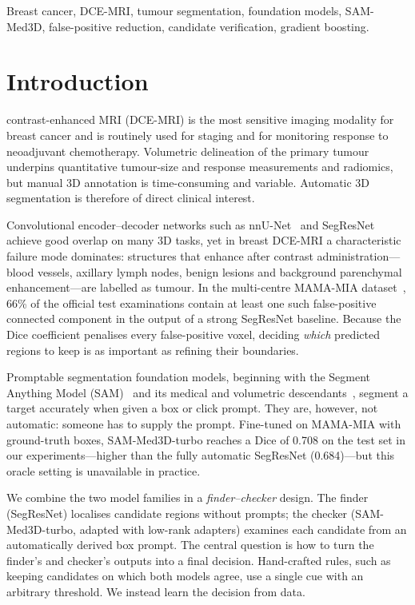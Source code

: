 \documentclass[journal]{IEEEtran}
\begin{document}
\begin{IEEEkeywords}
Breast cancer, DCE-MRI, tumour segmentation, foundation models, SAM-Med3D, false-positive reduction, candidate verification, gradient boosting.
\end{IEEEkeywords}

\section{Introduction}
 contrast-enhanced MRI (DCE-MRI) is the most sensitive imaging modality for breast cancer and is routinely used for staging and for monitoring response to neoadjuvant chemotherapy. Volumetric delineation of the primary tumour underpins quantitative tumour-size and response measurements and radiomics, but manual 3D annotation is time-consuming and variable. Automatic 3D segmentation is therefore of direct clinical interest.

Convolutional encoder--decoder networks such as nnU-Net~\cite{isensee2021nnunet} and SegResNet~\cite{myronenko2019segresnet} achieve good overlap on many 3D tasks, yet in breast DCE-MRI a characteristic failure mode dominates: structures that enhance after contrast administration---blood vessels, axillary lymph nodes, benign lesions and background parenchymal enhancement---are labelled as tumour. In the multi-centre MAMA-MIA dataset~\cite{garrucho2025mamamia}, 66\% of the official test examinations contain at least one such false-positive connected component in the output of a strong SegResNet baseline. Because the Dice coefficient penalises every false-positive voxel, deciding \emph{which} predicted regions to keep is as important as refining their boundaries.

Promptable segmentation foundation models, beginning with the Segment Anything Model (SAM)~\cite{kirillov2023sam} and its medical and volumetric descendants~\cite{ma2024medsam,wang2023sammed3d}, segment a target accurately when given a box or click prompt. They are, however, not automatic: someone has to supply the prompt. Fine-tuned on MAMA-MIA with ground-truth boxes, SAM-Med3D-turbo reaches a Dice of 0.708 on the test set in our experiments---higher than the fully automatic SegResNet (0.684)---but this oracle setting is unavailable in practice.

We combine the two model families in a \emph{finder--checker} design. The finder (SegResNet) localises candidate regions without prompts; the checker (SAM-Med3D-turbo, adapted with low-rank adapters) examines each candidate from an automatically derived box prompt. The central question is how to turn the finder's and checker's outputs into a final decision. Hand-crafted rules, such as keeping candidates on which both models agree, use a single cue with an arbitrary threshold. We instead learn the decision from data.
\end{document}
